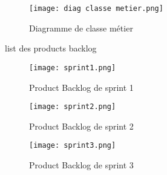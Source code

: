 
\begin{figure}[h]
    \centering
    \texttt{[image: diag classe metier.png]}
    \caption{Diagramme de classe métier}
\end{figure}


list des products backlog

\begin{figure}[h]
    \centering
    \texttt{[image: sprint1.png]}
    \caption{Product Backlog de sprint 1}
    \label{Sprint1}
\end{figure}


\begin{figure}[h]
    \centering
    \texttt{[image: sprint2.png]}
    \caption{Product Backlog de sprint 2}
    \label{Sprint2}
\end{figure}


\begin{figure}[h]
    \centering
    \texttt{[image: sprint3.png]}
    \caption{Product Backlog de sprint 3}
    \label{Sprint3}
\end{figure}




